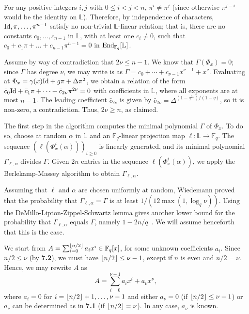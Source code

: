 \documentclass[sigconf]{acmart}
\newcommand{\F}{\mathbb{F}}
\renewcommand{\L}{\mathbb{L}}
\DeclarePairedDelimiter\floor{\lfloor}{\rfloor}
\begin{document}
For any positive integers $i,j$ with $0 \le i < j < n$, $\pi^i \ne
\pi^j$ (since otherwise $\pi^{j-i}$ would be the identity on
$\L$). Therefore, by independence of characters, ${\rm Id}, \pi,
\ldots, \pi^{n-1}$ satisfy no non-trivial $\L$-linear relation;
that is, there are no constants $c_0, \ldots, c_{n-1}$ in $\L$,
with at least one $c_i \neq 0$, such that $c_0 + c_1 \pi + \ldots +
c_{n-1}\pi^{n-1}=0$ in ${\rm End}_{\F_q}[\L]$.

Assume by way of contradiction that $2\nu \le n-1$.  We know that
$\Gamma(\Phi_x) = 0$; since $\Gamma$ has degree $\nu$, we may write
is as $\Gamma = c_0 + \cdots + c_{\nu-1} x^{\nu-1} +
x^\nu$. Evaluating at $\Phi_x = \gamma(x) {\rm Id} + g \pi + \Delta
\pi^2$, we obtain a relation of the form $\bar c_0 {\rm Id} + \bar
c_1 \pi + \cdots + \bar c_{2\nu} \pi^{2\nu} = 0$ with
coefficients in $\L$, where all exponents are at most $n-1$. The
leading coefficient $\bar c_{2\nu}$ is given by $\bar c_{2\nu} =
\Delta^{(1-q^{2\nu})/(1-q)}$, so it is non-zero, a contradiction.
Thus, $2\nu \ge n$, as claimed.

\smallskip{} The first step in the algorithm computes
the minimal polynomial $\Gamma$ of $\Phi_x$. 
To do so, choose at random $\alpha$ in $\L$ and an $\F_q$-linear
projection map  $\ell: \L \to \F_q$. The sequence
$(\ell(\Phi_x^i(\alpha)))_{i \ge 0}$ is linearly generated, and its
minimal polynomial $\Gamma_{\ell,\alpha}$ divides $\Gamma$. Given $2n$
entries in the sequence $\ell(\Phi_x^i(\alpha))$, we apply the
Berlekamp-Massey algorithm to obtain $\Gamma_{\ell,\alpha}$.

Assuming that $\ell$ and $\alpha$ are chosen uniformly at random,
Wiedemann proved~\cite{Wiedemann:1986:SSL:13738.13744} that the
probability that $\Gamma_{\ell,\alpha}=\Gamma$ is at least $1/(12
\max(1, \log_q \nu))$. Using the DeMillo-Lipton-Zippel-Schwartz lemma
gives another lower bound for the probability that
$\Gamma_{\ell,\alpha}$ equals $\Gamma$, namely
$1-2n/q$~\cite{Kaltofen:1991:PEP:113379.113396,Kaltofen-saun:1991:WMS:646027.676885}. We
will assume henceforth that this is the case.

\smallskip{}
We start from $A = \sum_{i = 0}^{\floor*{n/2}}a_ix^i \in \F_q[x]$, for
some unknown coefficients $a_i$. Since $n/2 \le \nu$ (by {\bf 7.2}), we must have 
$\floor*{n/2} \le \nu -1$, except if $n$ is even and $n/2 = \nu$.
Hence, we may rewrite $A$ as 
$$A = \sum_{i = 0}^{\nu - 1}a_ix^i + a_{\nu}x^{\nu},$$ where $a_i = 0$
for $i=\floor*{n/2}+1,\dots,\nu-1$ and either $a_\nu=0$ (if
$\floor*{n/2} \le \nu -1$) or $a_\nu$ can be determined as in {\bf
  7.1} (if $\floor*{n/2} = \nu$). In any case, $a_\nu$ is known.
\end{document}
